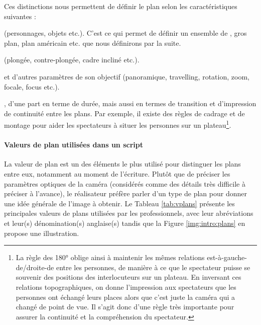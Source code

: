 Ces distinctions nous permettent de définir le plan selon les caractéristiques suivantes : 
\begin{liste}
	\item {} (personnages, objets etc.).
	C'est ce qui permet de définir un ensemble de , gros plan, plan américain etc. que nous définirons par la suite.
	
	\item {} (plongée, contre-plongée, cadre incliné etc.).

	\item {} et d'autres paramètres de son objectif (panoramique, travelling, rotation, zoom, focale, focus etc.).

	\item {}, d'une part en terme de durée, mais aussi en termes de transition et d'impression de continuité entre les plans. 
	Par exemple, il existe des règles de cadrage et de montage pour aider les spectateurs à situer les personnes sur un plateau\footnote{La règle des 180° oblige ainsi à maintenir les mêmes relations est-à-gauche-de/droite-de entre les personnes, de manière à ce que le spectateur puisse se souvenir des positions des interlocuteurs sur un plateau. En inversant ces relations topographiques, on donne l'impression aux spectateurs que les personnes ont échangé leurs places alors que c'est juste la caméra qui a changé de point de vue. Il s'agit donc d'une règle très importante pour assurer la continuité et la compréhension du spectateur.}.
\end{liste}


\paragraph{Valeurs de plan utilisées dans un script}
La valeur de plan est un des éléments le plus utilisé pour distinguer les plans entre eux, notamment au moment de l'écriture. 
Plutôt que de préciser les paramètres optiques de la caméra (considérés comme des détails très difficile à préciser à l'avance), le réalisateur préfère parler d'un type de plan pour donner une idée générale de l'image à obtenir. 
Le Tableau \ref{tab:vplans} présente les principales valeurs de plans utilisées par les professionnels, avec leur abréviations et leur(s) dénomination(s) anglaise(s) tandis que la Figure \ref{img:intro:plans} en propose une illustration.

